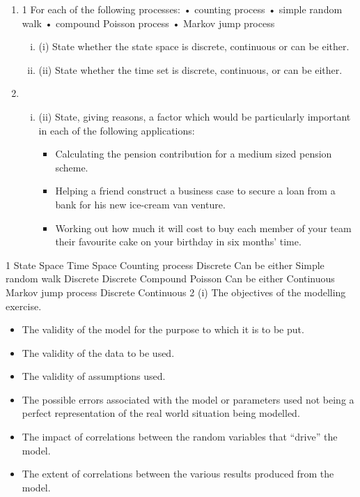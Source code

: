 \documentclass[a4paper,12pt]{article}
\begin{document}
\begin{enumerate}
\item 
1 For each of the following processes:
• counting process
• simple random walk
• compound Poisson process
• Markov jump process
\begin{enumerate}[(i)]
\item (i) State whether the state space is discrete, continuous or can be either. 
\item (ii) State whether the time set is discrete, continuous, or can be either. 

\end{enumerate}
\item 
\begin{enumerate}[(i)](i) List eight factors which should be considered when assessing whether a model
is suitable for a particular application. 
\item (ii) State, giving reasons, a factor which would be particularly important in each
of the following applications:
\begin{itemize}
    \item  Calculating the pension contribution for a medium sized pension scheme.
\item Helping a friend construct a business case to secure a loan from a bank for
his new ice-cream van venture.
\item Working out how much it will cost to buy each member of your team their
favourite cake on your birthday in six months’ time.
\end{itemize}
\end{enumerate}

\end{enumerate}

1 State Space Time Space
Counting process Discrete Can be either
Simple random walk Discrete Discrete
Compound Poisson Can be either Continuous
Markov jump process Discrete Continuous
2 (i) The objectives of the modelling exercise.
\begin{itemize}
    \item The validity of the model for the purpose to which it is to be put.
    \item The validity of the data to be used.
    \item The validity of assumptions used.
    \item The possible errors associated with the model or parameters used not being a
perfect representation of the real world situation being modelled.
    \item The impact of correlations between the random variables that “drive” the
model.
    \item The extent of correlations between the various results produced from the
model.
\end{itemize}
\end{document}
